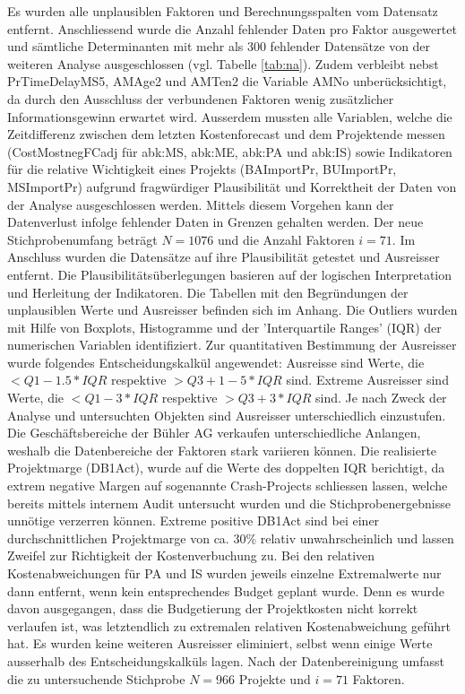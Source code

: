 \newline
Es wurden alle unplausiblen Faktoren und Berechnungsspalten vom Datensatz entfernt. Anschliessend wurde die Anzahl fehlender Daten pro Faktor ausgewertet und sämtliche Determinanten mit mehr als 300 fehlender Datensätze von der weiteren Analyse ausgeschlossen (vgl. Tabelle \ref{tab:na}). Zudem verbleibt nebst PrTimeDelayMS5, AMAge2 und AMTen2 die Variable AMNo unberücksichtigt, da durch den Ausschluss der verbundenen Faktoren wenig zusätzlicher Informationsgewinn erwartet wird. Ausserdem mussten alle Variablen, welche die Zeitdifferenz zwischen dem letzten Kostenforecast und dem Projektende messen (CostMostnegFCadj für \gls{abk:MS}, \gls{abk:ME}, \gls{abk:PA} und \gls{abk:IS}) sowie Indikatoren für die relative Wichtigkeit eines Projekts (BAImportPr, BUImportPr, MSImportPr) aufgrund fragwürdiger Plausibilität und Korrektheit der Daten von der Analyse ausgeschlossen werden. Mittels diesem Vorgehen kann der Datenverlust infolge fehlender Daten in Grenzen gehalten werden. Der neue Stichprobenumfang beträgt $N = 1076$ und die Anzahl Faktoren $i = 71$.
\newline
Im Anschluss wurden die Datensätze auf ihre Plausibilität getestet und Ausreisser entfernt. Die Plausibilitätsüberlegungen basieren auf der logischen Interpretation und Herleitung der Indikatoren. Die Tabellen mit den Begründungen der unplausiblen Werte und Ausreisser befinden sich im Anhang. Die Outliers wurden mit Hilfe von Boxplots, Histogramme und der 'Interquartile Ranges' (IQR) der numerischen Variablen identifiziert. Zur quantitativen Bestimmung der Ausreisser wurde folgendes Entscheidungskalkül angewendet:
\newline\newline
Ausreisse sind Werte, die $< Q1 - 1.5 * IQR$ respektive $ > Q3 + 1-5 * IQR$ sind.
\newline
Extreme Ausreisser sind Werte, die $< Q1 - 3 * IQR$ respektive $> Q3 + 3 * IQR$ sind.
\newline\newline
Je nach Zweck der Analyse und untersuchten Objekten sind Ausreisser unterschiedlich einzustufen. Die Geschäftsbereiche der Bühler AG verkaufen unterschiedliche Anlangen, weshalb die Datenbereiche der Faktoren stark variieren können. Die realisierte Projektmarge (DB1Act), wurde auf die Werte des doppelten IQR berichtigt, da extrem negative Margen auf sogenannte Crash-Projects schliessen lassen, welche bereits mittels internem Audit untersucht wurden und die Stichprobenergebnisse unnötige verzerren können. Extreme positive DB1Act sind bei einer durchschnittlichen Projektmarge von ca. 30\% relativ unwahrscheinlich und lassen Zweifel zur Richtigkeit der Kostenverbuchung zu. Bei den relativen Kostenabweichungen für PA und IS wurden jeweils einzelne Extremalwerte nur dann entfernt, wenn kein entsprechendes Budget geplant wurde. Denn es wurde davon ausgegangen, dass die Budgetierung der Projektkosten nicht korrekt verlaufen ist, was letztendlich zu extremalen relativen Kostenabweichung geführt hat. Es wurden keine weiteren Ausreisser eliminiert, selbst wenn einige Werte ausserhalb des Entscheidungskalküls lagen. Nach der Datenbereinigung umfasst die zu untersuchende Stichprobe $N = 966$ Projekte und $ i = 71$ Faktoren.
